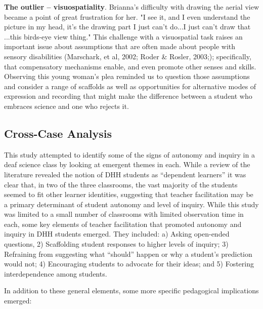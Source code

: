 \documentclass[11.5pt]{sig-alternate} %
\begin{document}
\begin{large}
\textbf{The outlier – visuospatiality}. Brianna’s difficulty with drawing the aerial view became a point of great frustration for her. "I see it, and I even understand the picture in my head, it’s the drawing part I just can't do...I just can't draw that ...this birds-eye view thing." This challenge with a visuospatial task raises an important issue about assumptions that are often made about people with sensory disabilities (Marschark, et al, 2002; Roder \& Rosler, 2003;); specifically, that compensatory mechanisms enable, and even promote other senses and skills.  Observing this young woman’s plea reminded us to question those assumptions and consider a range of scaffolds as well as opportunities for alternative modes of expression and recording that might make the difference between a student who embraces science and one who rejects it.

\subsection*{Cross-Case Analysis}

This study attempted to identify some of the signs of autonomy and inquiry in a deaf science class by looking at emergent themes in each.  While a review of the literature revealed the notion of DHH students as “dependent learners” it was clear that, in two of the three classrooms, the vast majority of the students seemed to fit other learner identities, suggesting that teacher facilitation may be a primary determinant of student autonomy and level of inquiry.  While this study was limited to a small number of classrooms with limited observation time in each, some key elements of teacher facilitation that promoted autonomy and inquiry in DHH students emerged.  They included: a) Asking open-ended questions, 2) Scaffolding student responses to higher levels of inquiry; 3) Refraining from suggesting what “should” happen or why a student’s prediction would not; 4) Encouraging students to advocate for their ideas; and 5) Fostering interdependence among students.  

In addition to these general elements, some more specific pedagogical implications emerged: 


\end{large}
\end{document}
